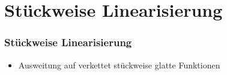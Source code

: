 \section[Problemstellung]{Stückweise Linearisierung}
\begin{frame}[<+->]
\frametitle{Stückweise Linearisierung}
\begin{itemize}
 \item Ausweitung auf verkettet stückweise glatte Funktionen
\end{itemize}

\end{frame}

